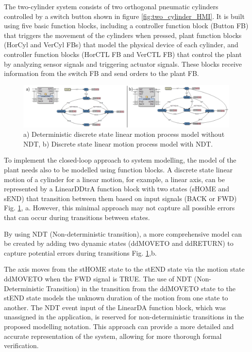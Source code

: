 \begin{bibunit}
The two-cylinder system  consists of two orthogonal pneumatic cylinders controlled by a switch button shown in figure \ref{fig:two_cylinder_HMI}. It is built using five basic function blocks, including a controller function block (Button FB) that triggers the movement of the cylinders when pressed, plant function blocks (HorCyl and VerCyl FBs) that model the physical device of each cylinder, and controller function blocks (HorCTL FB and VerCTL FB) that control the plant by analyzing sensor signals and triggering actuator signals. These blocks receive information from the switch FB and send orders to the plant FB.

\begin{figure}
    \centering
    \includegraphics[width=1\textwidth]{MX_Papers/Paper1/images/NDT_linear.PNG}
    \caption{a) Deterministic discrete state linear motion process model without NDT, b) Discrete state linear motion process model with NDT.}
    \label{fig:NDT_in_Plant}
\end{figure}

To implement the closed-loop approach to system modelling, the model of the plant needs also to be modelled using function blocks. A discrete state linear motion of a cylinder for a linear motion, for example, a linear axis, can be represented by a LinearDDtrA function block with two states (sHOME and sEND) that transition between them based on input signals (BACK or FWD) Fig. \ref{fig:NDT_in_Plant}, a. However, this minimal approach may not capture all possible errors that can occur during transitions between states. 

By using NDT (Non-deterministic transition), a more comprehensive model can be created by adding two dynamic states (ddMOVETO and ddRETURN) to capture potential errors during transitions Fig. \ref{fig:NDT_in_Plant},b.

The axis moves from the stHOME state to the stEND state via the motion state ddMOVETO when the FWD signal is TRUE. The use of NDT (Non-Deterministic Transition) in the transition from the ddMOVETO state to the stEND state models the unknown duration of the motion from one state to another. The NDT event input of the LinearDA function block, which was unassigned in the application, is reserved for non-deterministic transitions in the proposed modelling notation. This approach can provide a more detailed and accurate representation of the system, allowing for more thorough formal verification. 


\end{bibunit}
